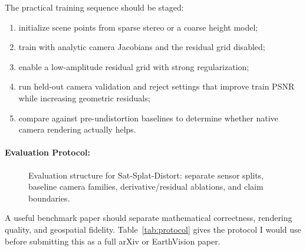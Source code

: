 \documentclass{article}
\begin{document}
The practical training sequence should be staged:
\begin{enumerate}
  \item initialize scene points from sparse stereo or a coarse height model;
  \item train with analytic camera Jacobians and the residual grid disabled;
  \item enable a low-amplitude residual grid with strong regularization;
  \item run held-out camera validation and reject settings that improve train PSNR while increasing geometric residuals;
  \item compare against pre-undistortion baselines to determine whether native camera rendering actually helps.
\end{enumerate}

\paragraph{Evaluation Protocol:}

\begin{figure}[t]
\centering
{}
\caption{Evaluation structure for Sat-Splat-Distort: separate sensor splits, baseline camera families, derivative/residual ablations, and claim boundaries.}
\label{fig:sat-eval}
\end{figure}

A useful benchmark paper should separate mathematical correctness, rendering quality, and geospatial fidelity. Table~\ref{tab:protocol} gives the protocol I would use before submitting this as a full arXiv or EarthVision paper.
\end{document}
